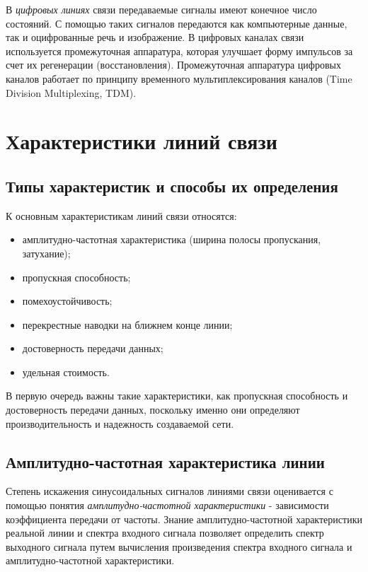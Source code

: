 В \emph{цифровых линиях} связи передаваемые сигналы имеют конечное число состояний.
С помощью таких сигналов передаются как компьютерные данные, так и оцифрованные речь и изображение.
В цифровых каналах связи используется промежуточная аппаратура, которая улучшает форму импульсов за счет их регенерации (восстановления).
Промежуточная аппаратура цифровых каналов работает по принципу временного мультиплексирования каналов (Time Division Multiplexing, TDM).

\section{Характеристики линий связи}

\subsection{Типы характеристик и способы их определения}

К основным характеристикам линий связи относятся:
\begin{itemize}
    \item амплитудно-частотная характеристика (ширина полосы пропускания, затухание);
    \item пропускная способность;
    \item помехоустойчивость;
    \item перекрестные наводки на ближнем конце линии;
    \item достоверность передачи данных;
    \item удельная стоимость.
\end{itemize}

В первую очередь важны такие характеристики, как пропускная способность и достоверность передачи данных, поскольку именно они определяют производительность и надежность создаваемой сети.

\subsection{Амплитудно-частотная характеристика линии}

Степень искажения синусоидальных сигналов линиями связи оценивается с помощью понятия \emph{амплитудно-частотной характеристики} - зависимости коэффициента передачи от частоты.
Знание амплитудно-частотной характеристики реальной линии и спектра входного сигнала позволяет определить спектр выходного сигнала путем вычисления произведения спектра входного сигнала и амплитудно-частотной характеристики.

